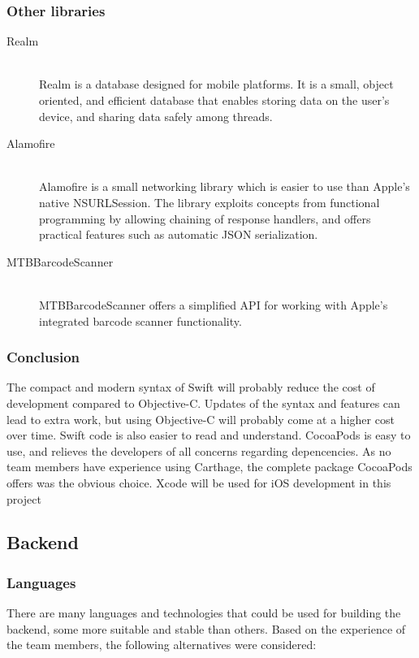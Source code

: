 \subsubsection{Other libraries} 
\begin{description}
    \item[Realm] \hfill \\
        Realm is a database designed for mobile platforms.\cite{realm} It is a small, object oriented, and efficient database that enables storing data on the user's device, and sharing data safely among threads.
    \item[Alamofire] \hfill \\
        Alamofire is a small networking library which is easier to use than Apple's native NSURLSession.\cite{alamofire} The library exploits concepts from functional programming by allowing chaining of response handlers, and offers practical features such as automatic JSON serialization.\cite{json}
    \item[MTBBarcodeScanner] \hfill \\
        MTBBarcodeScanner offers a simplified \gls{API} for working with Apple's integrated barcode scanner functionality.\cite{mtbbarcodescanner}
\end{description}


\subsubsection{Conclusion}
The compact and modern syntax of Swift will probably reduce the cost of development compared to Objective-C. Updates of the syntax and features can lead to extra work, but using Objective-C will probably come at a higher cost over time. Swift code is also easier to read and understand. CocoaPods is easy to use, and relieves the developers of all concerns regarding depencencies. As no team members have experience using Carthage, the complete package CocoaPods offers was the obvious choice. Xcode will be used for iOS development in this project

\subsection{Backend}


\subsubsection{Languages}
There are many languages and technologies that could be used for building the backend, some more suitable and stable than others. Based on the experience of the team members, the following alternatives were considered:

